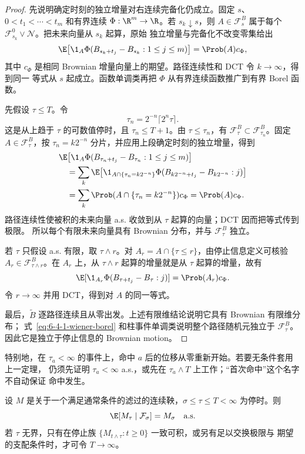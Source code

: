 \begin{proof}
先说明确定时刻的独立增量对右连续完备化仍成立。固定 $s$、
$0<t_1<\cdots<t_m$ 和有界连续 $\Phi:\R^m\to\R$。若 $s_k\downarrow s$，则
$A\in\mathcal F_s^B$ 属于每个 $\mathcal F_{s_k}^0\vee\mathcal N$。把未来向量从 $s_k$ 起算，原始
独立增量与完备化不改变零集给出
\[
 \E\bigl[\1_A\Phi(B_{s_k+t_j}-B_{s_k}:1\le j\le m)\bigr]
 =\Prob(A)c_\Phi,
\]
其中 $c_\Phi$ 是相同 Brownian 增量向量上的期望。路径连续性和 DCT 令 $k\to\infty$，得到同一
等式从 $s$ 起成立。函数单调类再把 $\Phi$ 从有界连续函数推广到有界 Borel 函数。

先假设 $\tau\le T$。令
\[
 \tau_n=2^{-n}\lceil2^n\tau\rceil.
\]
这是从上趋于 $\tau$ 的可数值停时，且 $\tau_n\le T+1$。由
$\tau\le\tau_n$，有 $\mathcal F_\tau^B\subset\mathcal F_{\tau_n}^B$。固定
$A\in\mathcal F_\tau^B$，按 $\tau_n=k2^{-n}$ 分片，并应用上段确定时刻的独立增量，得到
\begin{align*}
 &\E\bigl[\1_A\Phi(B_{\tau_n+t_j}-B_{\tau_n}:1\le j\le m)\bigr]\\
 &\quad=\sum_k
 \E\bigl[\1_{A\cap\{\tau_n=k2^{-n}\}}
 \Phi(B_{k2^{-n}+t_j}-B_{k2^{-n}}:j)\bigr]\\
 &\quad=\sum_k\Prob(A\cap\{\tau_n=k2^{-n}\})c_\Phi
 =\Prob(A)c_\Phi.
\end{align*}
路径连续性使被积的未来向量 a.s. 收敛到从 $\tau$ 起算的向量；DCT 因而把等式传到极限。
所以每个有限未来向量具有 Brownian 分布，并与 $\mathcal F_\tau^B$ 独立。

若 $\tau$ 只假设 a.s. 有限，取 $\tau\wedge r$。对
$A_r=A\cap\{\tau\le r\}$，由停止信息定义可核验
$A_r\in\mathcal F_{\tau\wedge r}^B$。在 $A_r$ 上，从 $\tau\wedge r$ 起算的增量就是从 $\tau$
起算的增量，故有
\[
 \E[\1_{A_r}\Phi(B_{\tau+t_j}-B_\tau:j)]
 =\Prob(A_r)c_\Phi.
\]
令 $r\to\infty$ 并用 DCT，得到对 $A$ 的同一等式。

最后，$\widetilde B$ 逐路径连续且从零出发。上述有限维结论说明它具有 Brownian 有限维分布；
式~\eqref{eq:6-4-1-wiener-borel} 和柱事件单调类说明整个路径随机元独立于
$\mathcal F_\tau^B$。因此它是独立于停止信息的 Brownian motion。
\end{proof}

特别地，在 $\tau_a<\infty$ 的事件上，命中 $a$ 后的位移从零重新开始。若要无条件套用上一定理，
仍须先证明 $\tau_a<\infty$ a.s.，或先在 $\tau_a\wedge T$ 上工作；“首次命中”这个名字不自动保证
命中发生。

\begin{proposition}[连续时间可选抽样]\label{proposition:6-4-1-continuous-optional}
设 $M$ 是关于一个满足通常条件的滤过的连续鞅，$\sigma\le\tau\le T<\infty$ 为停时。则
\[
 \E[M_\tau\mid\mathcal F_\sigma]=M_\sigma\quad\text{a.s.}
\]
若 $\tau$ 无界，只有在停止族 $\{M_{t\wedge\tau}:t\ge0\}$ 一致可积，或另有足以交换极限与
期望的支配条件时，才可令 $T\to\infty$。
\end{proposition}

